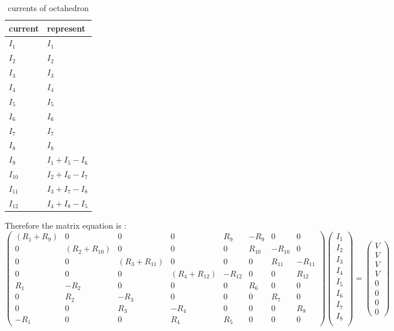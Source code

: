 \documentclass[11pt,letterpaper]{article}
\begin{document}
\begin{table}[h]
\caption{currents of octahedron\label{table2}}
\begin{tabular}{l l}
\hline
 \textbf{current} & \textbf{represent}\\
\hline
$I_1$ & $I_1$ \\
$I_2$ & $I_2$ \\
$I_3$ & $I_3$ \\
$I_4$ & $I_4$ \\
$I_5$ & $I_5$ \\
$I_6$ & $I_6$ \\
$I_7$ & $I_7$ \\
$I_8$ & $I_8$ \\
$I_9$ & $I_1+I_5-I_6$ \\
$I_{10}$ & $I_2+I_6-I_7$  \\
$I_{11}$ & $I_3+I_7-I_8$  \\
$I_{12}$ & $I_4+I_8-I_5$  \\
\hline
\end{tabular}
\end{table}

Therefore the matrix equation is :
$$
\begin{pmatrix}
 (R_1+R_9) & 0 & 0 & 0 & R_9 & -R_9 & 0 & 0   \\
 0 & (R_2+R_{10}) & 0 & 0 & 0 & R_{10} & -R_{10} & 0 \\
 0 & 0 & (R_3+R_{11}) & 0 & 0 & 0 & R_{11} & -R_{11} \\
 0 & 0 & 0 & (R_4+R_{12}) & -R_{12} & 0 & 0 & R_{12} \\
 R_1 & -R_2 & 0 & 0 & 0 & R_6 & 0 & 0 \\
 0 & R_2 & -R_3 & 0 & 0 & 0 & R_7 & 0 \\
 0 & 0 & R_3 & -R_4 & 0 & 0 & 0 & R_8 \\
 -R_1 & 0 & 0 & R_4 & R_5 & 0 & 0 & 0 
\end{pmatrix}
\begin{pmatrix}
 I_1\\
 I_2\\
 I_3\\
 I_4\\
 I_5\\
 I_6\\
 I_7\\
 I_8\\
\end{pmatrix}
=
\begin{pmatrix}
 V\\
 V\\
 V\\
 V\\
 0\\
 0\\
 0\\
 0
\end{pmatrix}
$$
\end{document}
